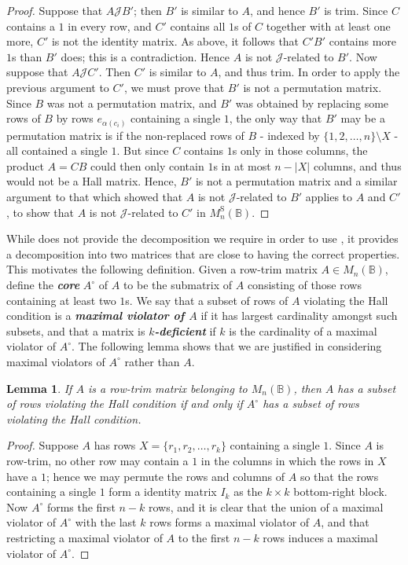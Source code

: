 \documentclass[11pt]{article}
\newtheorem{lemma}[thm]{Lemma}
\newcommand{\defn}[1]{\textbf{\textit{#1}}}
\numberwithin{equation}{section}
\newcommand{\B}{\mathbb{B}}
\newcommand{\Bn}{M_n(\B)}
\newcommand{\Halln}{M_n^{\text{S}}(\B)}
\newcommand{\J}{\mathscr{J}}
\begin{document}
\begin{proof}
  Suppose that $A \J B'$; then $B'$ is similar to $A$, and hence $B'$
  is trim. Since $C$ contains a $1$ in every row, and $C'$ contains all $1$s of
  $C$ together with at least one more, $C'$ is not the identity matrix.
  As above, it follows that $C'B'$ contains more $1$s than $B'$ does; this is a
  contradiction. Hence $A$ is not $\J$-related to $B'$. Now suppose that $A\J
  C'$. Then $C'$ is similar to $A$, and thus trim.
  In order to apply the previous argument to $C'$, we must prove that $B'$ is
  not a permutation matrix. Since $B$ was not a permutation matrix, and $B'$ was
  obtained by replacing some rows of $B$ by rows $e_{\alpha(c_i)}$ containing a
  single $1$, the only way that $B'$ may be a permutation matrix is if the
  non-replaced rows of $B$ - indexed by $\{1, 2, \ldots, n\}\setminus X$ - all
  contained a single $1$.  But since $C$ contains $1$s only in those columns,
  the product $A = CB$ could then only contain $1$s in at most $n - |X|$
  columns, and thus would not be a Hall matrix.  Hence, $B'$ is not a
  permutation matrix and a similar argument to that which showed that $A$ is not
  $\J$-related to $B'$ applies to $A$ and $C'$, to show that $A$ is not
  $\J$-related to $C'$ in $\Halln$.
\end{proof}

While  does not provide the decomposition we
require in order to use , it provides a
decomposition into two matrices that are close to having the correct properties.
This motivates the following definition. Given a row-trim matrix $A \in \Bn$,
define the \defn{core} $A^\circ$ of $A$ to be the submatrix of $A$ consisting of
those rows containing at least two $1$s. We say that a subset of rows of $A$
violating the Hall condition is a \defn{maximal violator of $A$} if it has
largest cardinality amongst such subsets, and that a matrix is
\defn{$k$-deficient} if $k$ is the cardinality of a maximal violator of
$A^\circ$. The following lemma shows that we are justified in considering
maximal violators of $A^\circ$ rather than $A$. 

\begin{lemma}
  If $A$ is a row-trim matrix belonging to $\Bn$, then $A$ has a subset of rows
  violating the Hall condition if and only if $A^\circ$ has a subset of rows
  violating the Hall condition.
\end{lemma}
\begin{proof}
  Suppose $A$ has rows $X = \{r_1, r_2, \ldots, r_k\}$ containing a single $1$.
  Since $A$ is row-trim, no other row may contain a $1$ in the columns in which
  the rows in $X$ have a $1$; hence we may permute the rows and columns of $A$ so
  that the rows containing a single $1$ form a identity matrix $I_k$ as the $k
  \times k$ bottom-right block. Now $A^\circ$ forms the first $n-k$ rows, and it
  is clear that the union of a maximal violator of $A^\circ$ with the last $k$
  rows forms a maximal violator of $A$, and that restricting a maximal violator
  of $A$ to the first $n-k$ rows induces a maximal violator of $A^\circ$.
\end{proof}
\end{document}
